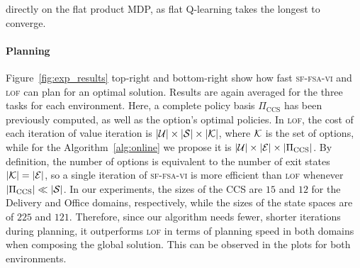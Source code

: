 directly on the flat product MDP, as flat Q-learning takes the longest to converge.

\paragraph{Planning} Figure~\ref{fig:exp_results} top-right and bottom-right show how fast \textsc{sf-fsa-vi} and \textsc{lof} can plan for an optimal solution. Results are again averaged for the three tasks for each environment. Here, a complete policy basis $\Pi_\text{CCS}$ has been previously computed, as well as the option's optimal policies.  In \textsc{lof}, the cost of each iteration of value iteration is $\lvert\mathcal{U}\rvert\times\lvert\mathcal{S}\rvert\times \lvert\mathcal{K}\rvert$, where $\mathcal{K}$ is the set of options, while for the Algorithm~\ref{alg:online} we propose it is $\lvert\mathcal{U}\rvert\times\lvert\mathcal{E}\rvert\times\lvert\Pi_\text{CCS}\rvert$. By definition, the number of options is equivalent to the number of exit states $\lvert\mathcal{K}\rvert=\lvert\mathcal{E}\rvert$, so a single iteration of \textsc{sf-fsa-vi} is more efficient than \textsc{lof} whenever $\lvert\Pi_\text{CCS}\rvert \ll \lvert\mathcal{S}\rvert$. In our experiments, the sizes of the CCS are $15$ and $12$ for the Delivery and Office domains, respectively, while the sizes of the state spaces are of $225$ and $121$. Therefore, since our algorithm needs fewer, shorter iterations during planning, it outperforms \textsc{lof} in terms of planning speed in both domains when composing the global solution. This can be observed in the plots for both environments. 

%     
%     

